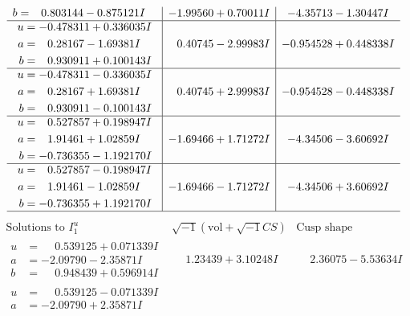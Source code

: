 \documentclass[1p]{elsarticle_modified}
\theoremstyle{definition}
\newcommand{\I}{\sqrt{-1}}
\begin{document}
$$\begin{array}{c|c|c}
\begin{aligned}
b &= \phantom{-}0.803144 - 0.875121 I\end{aligned}
 & -1.99560 + 0.70011 I & -4.35713 - 1.30447 I \\ \hline\begin{aligned}
u &= -0.478311 + 0.336035 I \\
a &= \phantom{-}0.28167 - 1.69381 I \\
b &= \phantom{-}0.930911 + 0.100143 I\end{aligned}
 & \phantom{-}0.40745 - 2.99983 I & -0.954528 + 0.448338 I \\ \hline\begin{aligned}
u &= -0.478311 - 0.336035 I \\
a &= \phantom{-}0.28167 + 1.69381 I \\
b &= \phantom{-}0.930911 - 0.100143 I\end{aligned}
 & \phantom{-}0.40745 + 2.99983 I & -0.954528 - 0.448338 I \\ \hline\begin{aligned}
u &= \phantom{-}0.527857 + 0.198947 I \\
a &= \phantom{-}1.91461 + 1.02859 I \\
b &= -0.736355 - 1.192170 I\end{aligned}
 & -1.69466 + 1.71272 I & -4.34506 - 3.60692 I \\ \hline\begin{aligned}
u &= \phantom{-}0.527857 - 0.198947 I \\
a &= \phantom{-}1.91461 - 1.02859 I \\
b &= -0.736355 + 1.192170 I\end{aligned}
 & -1.69466 - 1.71272 I & -4.34506 + 3.60692 I\\
 \hline 
 \end{array}$$\newpage$$\begin{array}{c|c|c}  
\text{Solutions to }I^u_{1}& \I (\text{vol} + \sqrt{-1}CS) & \text{Cusp shape}\\
 \hline 
\begin{aligned}
u &= \phantom{-}0.539125 + 0.071339 I \\
a &= -2.09790 - 2.35871 I \\
b &= \phantom{-}0.948439 + 0.596914 I\end{aligned}
 & \phantom{-}1.23439 + 3.10248 I & \phantom{-}2.36075 - 5.53634 I \\ \hline\begin{aligned}
u &= \phantom{-}0.539125 - 0.071339 I \\
a &= -2.09790 + 2.35871 I \\

\end{aligned}
\end{array}$$
\end{document}
